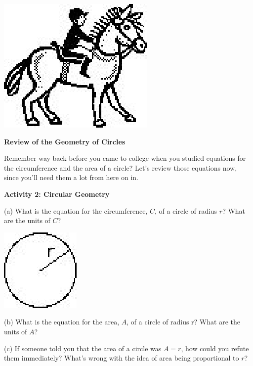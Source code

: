 \vspace{0.3cm}
{\par\raggedright \includegraphics{rotation_fig3.eps} \par}
\vspace{0.3cm}

\textbf{Review of the Geometry of Circles }

Remember way back before you came to college when you studied equations for
the circumference and the area of a circle? Let's review those equations now,
since you'll need them a lot from here on in.

\textbf{Activity 2: Circular Geometry} 

(a) What is the equation for the circumference, $C$, of a circle of radius $r$?
What are the units of $C$?

\vspace{0.3cm}
{\par\raggedright \includegraphics{rotation_fig4.eps} \par}
\vspace{0.3cm}

(b) What is the equation for the area, $A$, of a circle of radius r? What are
the units of $A$?
\vspace{10mm}

(c) If someone told you that the area of a circle was $A = r$, how could you refute
them immediately? What's wrong with the idea of area being proportional to $r$?
\vspace{20mm}

